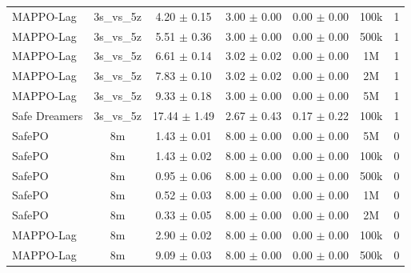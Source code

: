 \begin{longtable}{lcccccc}
MAPPO-Lag & 3s\_vs\_5z & \textcolor{green!60!black}{4.20 $\pm$ 0.15} & \textcolor{green!60!black}{3.00 $\pm$ 0.00} & \textcolor{green!60!black}{0.00 $\pm$ 0.00} & 100k & 1 \\
MAPPO-Lag & 3s\_vs\_5z & \textcolor{green!60!black}{5.51 $\pm$ 0.36} & \textcolor{green!60!black}{3.00 $\pm$ 0.00} & \textcolor{green!60!black}{0.00 $\pm$ 0.00} & 500k & 1 \\
MAPPO-Lag & 3s\_vs\_5z & \textcolor{green!60!black}{6.61 $\pm$ 0.14} & \textcolor{green!60!black}{3.02 $\pm$ 0.02} & \textcolor{green!60!black}{0.00 $\pm$ 0.00} & 1M & 1 \\
MAPPO-Lag & 3s\_vs\_5z & \textcolor{green!60!black}{7.83 $\pm$ 0.10} & \textcolor{green!60!black}{3.02 $\pm$ 0.02} & \textcolor{green!60!black}{0.00 $\pm$ 0.00} & 2M & 1 \\
MAPPO-Lag & 3s\_vs\_5z & \textcolor{green!60!black}{9.33 $\pm$ 0.18} & \textcolor{green!60!black}{3.00 $\pm$ 0.00} & \textcolor{green!60!black}{0.00 $\pm$ 0.00} & 5M & 1 \\
Safe Dreamers & 3s\_vs\_5z & 17.44 $\pm$ 1.49 & 2.67 $\pm$ 0.43 & 0.17 $\pm$ 0.22 & 100k & 1 \\
\midrule
SafePO & 8m & \textcolor{green!60!black}{1.43 $\pm$ 0.01} & \textcolor{green!60!black}{8.00 $\pm$ 0.00} & \textcolor{green!60!black}{0.00 $\pm$ 0.00} & 5M & 0 \\
SafePO & 8m & \textcolor{green!60!black}{1.43 $\pm$ 0.02} & \textcolor{green!60!black}{8.00 $\pm$ 0.00} & \textcolor{green!60!black}{0.00 $\pm$ 0.00} & 100k & 0 \\
SafePO & 8m & \textcolor{green!60!black}{0.95 $\pm$ 0.06} & \textcolor{green!60!black}{8.00 $\pm$ 0.00} & \textcolor{green!60!black}{0.00 $\pm$ 0.00} & 500k & 0 \\
SafePO & 8m & \textcolor{green!60!black}{0.52 $\pm$ 0.03} & \textcolor{green!60!black}{8.00 $\pm$ 0.00} & \textcolor{green!60!black}{0.00 $\pm$ 0.00} & 1M & 0 \\
SafePO & 8m & \textcolor{green!60!black}{0.33 $\pm$ 0.05} & \textcolor{green!60!black}{8.00 $\pm$ 0.00} & \textcolor{green!60!black}{0.00 $\pm$ 0.00} & 2M & 0 \\
MAPPO-Lag & 8m & \textcolor{green!60!black}{2.90 $\pm$ 0.02} & \textcolor{green!60!black}{8.00 $\pm$ 0.00} & \textcolor{green!60!black}{0.00 $\pm$ 0.00} & 100k & 0 \\
MAPPO-Lag & 8m & \textcolor{green!60!black}{9.09 $\pm$ 0.03} & \textcolor{green!60!black}{8.00 $\pm$ 0.00} & \textcolor{green!60!black}{0.00 $\pm$ 0.00} & 500k & 0 \\

\end{longtable}
